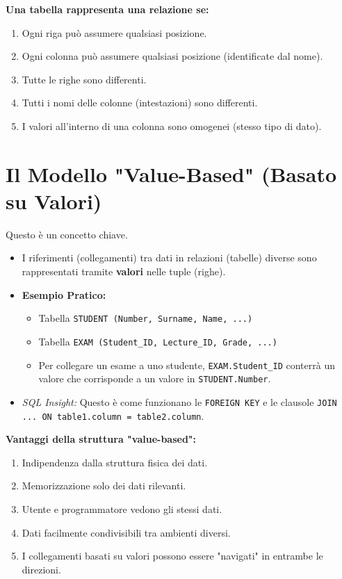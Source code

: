 	\textbf{Una tabella rappresenta una relazione se:}
	\begin{enumerate}
		\item Ogni riga può assumere qualsiasi posizione.
		\item Ogni colonna può assumere qualsiasi posizione (identificate dal nome).
		\item Tutte le righe sono differenti.
		\item Tutti i nomi delle colonne (intestazioni) sono differenti.
		\item I valori all'interno di una colonna sono omogenei (stesso tipo di dato).
	\end{enumerate}
	
	\section{Il Modello "Value-Based" (Basato su Valori)}
	Questo è un concetto chiave.
	\begin{itemize}
		\item I riferimenti (collegamenti) tra dati in relazioni (tabelle) diverse sono rappresentati tramite \textbf{valori} nelle tuple (righe).
		\item \textbf{Esempio Pratico:}
		\begin{itemize}
			\item Tabella \texttt{STUDENT (Number, Surname, Name, ...)}
			\item Tabella \texttt{EXAM (Student\_ID, Lecture\_ID, Grade, ...)}
			\item Per collegare un esame a uno studente, \texttt{EXAM.Student\_ID} conterrà un valore che corrisponde a un valore in \texttt{STUDENT.Number}.
		\end{itemize}
		\item \textit{SQL Insight:} Questo è come funzionano le \texttt{FOREIGN KEY} e le clausole \texttt{JOIN ... ON table1.column = table2.column}.
	\end{itemize}
	
	\textbf{Vantaggi della struttura "value-based":}
	\begin{enumerate}
		\item Indipendenza dalla struttura fisica dei dati.
		\item Memorizzazione solo dei dati rilevanti.
		\item Utente e programmatore vedono gli stessi dati.
		\item Dati facilmente condivisibili tra ambienti diversi.
		\item I collegamenti basati su valori possono essere "navigati" in entrambe le direzioni.
	\end{enumerate}
	
